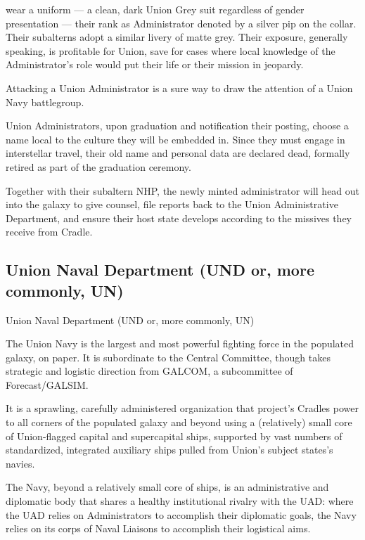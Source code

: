                                                                                                                   


wear a uniform — a clean, dark Union Grey suit regardless of gender presentation — their rank  
as Administrator denoted by a silver pip on the collar. Their subalterns adopt a similar livery of  
matte grey. Their exposure, generally speaking, is profitable for Union, save for cases where local  
knowledge of the Administrator’s role would put their life or their mission in jeopardy. 
 

Attacking a Union Administrator is a sure way to draw the attention of a Union Navy battlegroup.   
 

Union Administrators, upon graduation and notification their posting, choose a name local to the  
culture they will be embedded in. Since they must engage in interstellar travel, their old name  
and personal data are declared dead, formally retired as part of the graduation ceremony. 
 

Together with their subaltern NHP, the newly minted administrator will head out into the galaxy to  
give counsel, file reports back to the Union Administrative Department, and ensure their host  
state develops according to the missives they receive from Cradle.   
 
\subsection{Union Naval Department (UND or, more commonly, UN)}
Union Naval Department (UND or, more commonly, UN)  

The Union Navy is the largest and most powerful fighting force in the populated galaxy, on paper.  
It is subordinate to the Central Committee, though takes strategic and logistic direction from  
GALCOM, a subcommittee of Forecast/GALSIM.
 

It is a sprawling, carefully administered organization that project’s Cradles power to all corners of  
the populated galaxy and beyond using a (relatively) small core of Union-flagged capital and  
supercapital ships, supported by vast numbers of standardized, integrated auxiliary ships pulled  
from Union’s subject states’s navies.
 

The Navy, beyond a relatively small core of ships, is an administrative and diplomatic body that  
shares a healthy institutional rivalry with the UAD: where the UAD relies on Administrators to  
accomplish their diplomatic goals, the Navy relies on its corps of Naval Liaisons to accomplish  
their logistical aims. 
 

